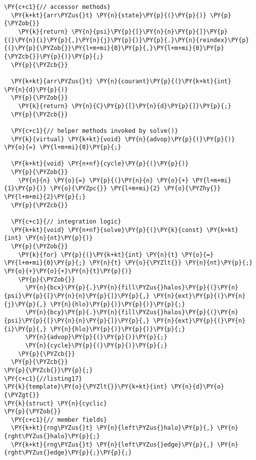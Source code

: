 \begin{Verbatim}[commandchars=\\\{\}]
  \PY{c+c1}{// accessor methods}
  \PY{k+kt}{arr\PYZus{}t} \PY{n}{state}\PY{p}{(}\PY{p}{)} \PY{p}{\PYZob{}}
    \PY{k}{return} \PY{n}{psi}\PY{p}{[}\PY{n}{n}\PY{p}{]}\PY{p}{(}\PY{n}{i}\PY{p}{,}\PY{n}{j}\PY{p}{)}\PY{p}{.}\PY{n}{reindex}\PY{p}{(}\PY{p}{\PYZob{}}\PY{l+m+mi}{0}\PY{p}{,}\PY{l+m+mi}{0}\PY{p}{\PYZcb{}}\PY{p}{)}\PY{p}{;}
  \PY{p}{\PYZcb{}}

  \PY{k+kt}{arr\PYZus{}t} \PY{n}{courant}\PY{p}{(}\PY{k+kt}{int} \PY{n}{d}\PY{p}{)} 
  \PY{p}{\PYZob{}} 
    \PY{k}{return} \PY{n}{C}\PY{p}{[}\PY{n}{d}\PY{p}{]}\PY{p}{;} 
  \PY{p}{\PYZcb{}}

  \PY{c+c1}{// helper methods invoked by solve()}
  \PY{k}{virtual} \PY{k+kt}{void} \PY{n}{advop}\PY{p}{(}\PY{p}{)} \PY{o}{=} \PY{l+m+mi}{0}\PY{p}{;}

  \PY{k+kt}{void} \PY{n+nf}{cycle}\PY{p}{(}\PY{p}{)} 
  \PY{p}{\PYZob{}} 
    \PY{n}{n} \PY{o}{=} \PY{p}{(}\PY{n}{n} \PY{o}{+} \PY{l+m+mi}{1}\PY{p}{)} \PY{o}{\PYZpc{}} \PY{l+m+mi}{2} \PY{o}{\PYZhy{}} \PY{l+m+mi}{2}\PY{p}{;} 
  \PY{p}{\PYZcb{}}

  \PY{c+c1}{// integration logic}
  \PY{k+kt}{void} \PY{n+nf}{solve}\PY{p}{(}\PY{k}{const} \PY{k+kt}{int} \PY{n}{nt}\PY{p}{)} 
  \PY{p}{\PYZob{}}
    \PY{k}{for} \PY{p}{(}\PY{k+kt}{int} \PY{n}{t} \PY{o}{=} \PY{l+m+mi}{0}\PY{p}{;} \PY{n}{t} \PY{o}{\PYZlt{}} \PY{n}{nt}\PY{p}{;} \PY{o}{+}\PY{o}{+}\PY{n}{t}\PY{p}{)} 
    \PY{p}{\PYZob{}}
      \PY{n}{bcx}\PY{p}{.}\PY{n}{fill\PYZus{}halos}\PY{p}{(}\PY{n}{psi}\PY{p}{[}\PY{n}{n}\PY{p}{]}\PY{p}{,} \PY{n}{ext}\PY{p}{(}\PY{n}{j}\PY{p}{,} \PY{n}{hlo}\PY{p}{)}\PY{p}{)}\PY{p}{;}
      \PY{n}{bcy}\PY{p}{.}\PY{n}{fill\PYZus{}halos}\PY{p}{(}\PY{n}{psi}\PY{p}{[}\PY{n}{n}\PY{p}{]}\PY{p}{,} \PY{n}{ext}\PY{p}{(}\PY{n}{i}\PY{p}{,} \PY{n}{hlo}\PY{p}{)}\PY{p}{)}\PY{p}{;}
      \PY{n}{advop}\PY{p}{(}\PY{p}{)}\PY{p}{;}
      \PY{n}{cycle}\PY{p}{(}\PY{p}{)}\PY{p}{;}
    \PY{p}{\PYZcb{}}
  \PY{p}{\PYZcb{}}
\PY{p}{\PYZcb{}}\PY{p}{;}
\PY{c+c1}{//listing17}
\PY{k}{template}\PY{o}{\PYZlt{}}\PY{k+kt}{int} \PY{n}{d}\PY{o}{\PYZgt{}}
\PY{k}{struct} \PY{n}{cyclic}
\PY{p}{\PYZob{}}
  \PY{c+c1}{// member fields}
  \PY{k+kt}{rng\PYZus{}t} \PY{n}{left\PYZus{}halo}\PY{p}{,} \PY{n}{rght\PYZus{}halo}\PY{p}{;}
  \PY{k+kt}{rng\PYZus{}t} \PY{n}{left\PYZus{}edge}\PY{p}{,} \PY{n}{rght\PYZus{}edge}\PY{p}{;}\PY{p}{;}


\end{Verbatim}
